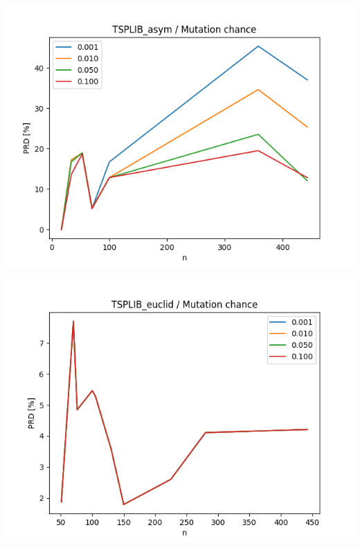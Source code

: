 \documentclass{article}
\begin{document}
\begin{center}
\includegraphics[width=\textwidth, 
                   height = 0.4\textheight, 
                   keepaspectratio]
                  {plots/tsplib_asym_8_mut_chance} 
\end{center}

\begin{center}
\includegraphics[width=\textwidth, 
                   height = 0.4\textheight, 
                   keepaspectratio]
                  {plots/tsplib_euclid_8_mut_chance} 
\end{center}
\end{document}
